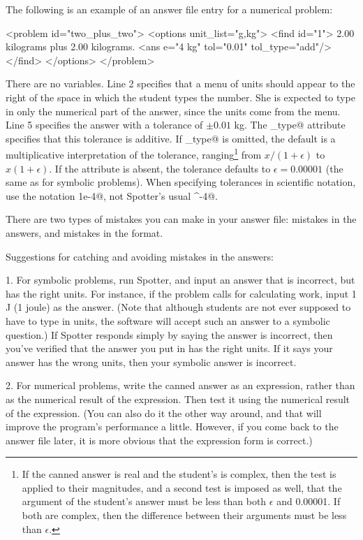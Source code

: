 \documentclass{doc}
\begin{document}
The following is an example of an answer file entry for a numerical
problem:
\begin{listing}{1}
  <problem id="two_plus_two">
    <options unit_list="g,kg">
      <find id="1">
        2.00 kilograms plus 2.00 kilograms.
        <ans e="4 kg" tol="0.01" tol_type="add"/>
      </find>
    </options>
  </problem>
\end{listing}

There are no variables. Line 2 specifies that a menu of units should
appear to the right of the space in which the student types the number.
She is expected to type in only the numerical part of the answer, since
the units come from the menu. Line 5 specifies the answer with
a tolerance of $\pm0.01$ kg. The \verb@tol_type@ attribute specifies
that this tolerance is additive. If \verb@tol_type@ is omitted,
the default is a multiplicative interpretation of the tolerance,
ranging\footnote{If the canned answer is real and the student's
is complex, then the test is applied to their magnitudes, and
a second test is imposed as well, that the argument of the student's answer must be
less than both $\epsilon$ and 0.00001. If both are complex, then the
difference between their
arguments must be less than $\epsilon$.}
 from $x/(1+\epsilon)$ to $x(1+\epsilon)$.
 If the \verb@tol@ attribute is
absent, the tolerance defaults to $\epsilon=0.00001$ (the same as for symbolic problems).
When specifying tolerances in scientific notation, use the notation
\verb@1e-4@, not Spotter's usual ^-4@.

\label{debugginganswerfile}
There are two types of mistakes you can make in your answer file: mistakes in the
answers, and mistakes in the format. 

Suggestions for catching and avoiding
mistakes in the answers:

1. For symbolic problems, run Spotter, and input an answer that is incorrect, but has the right units.
For instance, if the problem calls for calculating work, input 1 J (1 joule) as
the answer. (Note that although students are not ever supposed to have to type in
units, the software will accept such an answer to a symbolic question.) If Spotter
responds simply by saying the answer is incorrect, then you've verified that the
answer you put in has the right units. If it says your answer has the wrong units,
then your symbolic answer is incorrect.

2. For numerical problems, write the canned answer as an expression, rather than
as the numerical result of the expression. Then test it using the numerical
result of the expression. (You can also do it the other way around, and that will
improve the program's performance a little. However, if you come back to the answer
file later, it is more obvious that the expression form is correct.)
\end{document}
